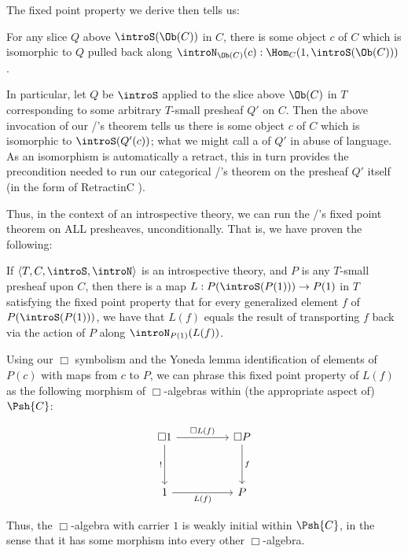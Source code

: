 
The fixed point property we derive then tells us:

\begin{theorem}\label{ObjectToSetFixedPoint}
For any slice $Q$ above $\introS(\Ob(C))$ in $C$, there is some object $c$ of $C$ which is isomorphic to $Q$ pulled back along $\introN_{\Ob(C)}(c) : \Hom_C(1, \introS(\Ob(C)))$.
\end{theorem}

In particular, let $Q$ be $\introS$ applied to the slice above $\Ob(C)$ in $T$ corresponding to some arbitrary $T$-small presheaf $Q'$ on $C$. Then the above invocation of our \Loeb/'s theorem tells us there is some object $c$ of $C$ which is isomorphic to $\introS(Q'(c))$; what we might call a  of $Q'$ in abuse of language. As an isomorphism is automatically a retract, this in turn provides the precondition needed to run our categorical \Loeb/'s theorem on the presheaf $Q'$ itself (in the form of RetractinC \TODO).

Thus, in the context of an introspective theory, we can run the \Loeb/'s fixed point theorem on ALL presheaves, unconditionally. That is, we have proven the following:

\label{LoebInIntrosp}
If $\langle T, C, \introS, \introN \rangle$ is an introspective theory, and $P$ is any $T$-small presheaf upon $C$, then there is a map $L : P(\introS(P(1))) \to P(1)$ in $T$ satisfying the fixed point property that for every generalized element $f$ of $P(\introS(P(1)))$, we have that $L(f)$ equals the result of transporting $f$ back via the action of $P$ along $\introN_{P(1)}(L(f))$.

Using our $\Box$ symbolism and the Yoneda lemma identification of elements of $P(c)$ with maps from $c$ to $P$, we can phrase this fixed point property of $L(f)$ as the following morphism of $\Box$-algebras within (the appropriate aspect of) $\Psh{C}$:

\[\begin{tikzcd}
	{\Box 1} && {\Box P} \\
	\\
	1 && P
	\arrow["f", from=1-3, to=3-3]
	\arrow["{!}"', from=1-1, to=3-1]
	\arrow["{\Box L(f)}", from=1-1, to=1-3]
	\arrow["{L(f)}"', from=3-1, to=3-3]
\end{tikzcd}\]

Thus, the $\Box$-algebra with carrier $1$ is weakly initial within $\Psh{C}$, in the sense that it has some morphism into every other $\Box$-algebra.

